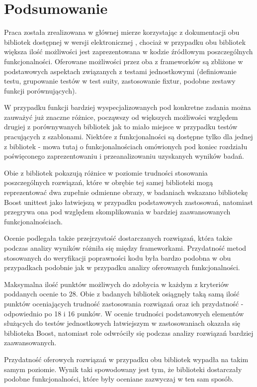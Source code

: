 \documentclass[12pt,a4paper,notitlepage]{report}
\begin{document}
\chapter{Podsumowanie}
	Praca została zrealizowana w głównej mierze korzystając z dokumentacji obu bibliotek dostępnej w wersji elektronicznej \cite{Primer}\cite{Advanced}\cite{Boost}, chociaż w przypadku obu bibliotek większa ilość możliwości jest zaprezentowana w kodzie źródłowym poszczególnych funkcjonalności. Oferowane możliwości przez oba z frameworków są zbliżone w podstawowych aspektach związanych z testami jednostkowymi (definiowanie testu, grupowanie testów w test suity, zastosowanie fixtur, podobne zestawy funkcji porównujących).

	W przypadku funkcji bardziej wyspecjalizowanych pod konkretne zadania można zauważyć już znaczne różnice, począwszy od większych możliwości względem drugiej z porównywanych bibliotek jak to miało miejsce w przypadku testów pracujących z szablonami. Niektóre z funkcjonalności są dostępne tylko dla jednej z bibliotek - mowa tutaj o funkcjonalnościach omówionych pod koniec rozdziału poświęconego zaprezentowaniu i przeanalizowaniu uzyskanych wyników badań.

	Obie z bibliotek pokazują różnice w poziomie trudności stosowania poszczególnych rozwiązań, które w obrębie tej samej biblioteki mogą reprezentować dwa zupełnie odmienne obrazy, w badaniach wskazano bibliotekę Boost unittest jako łatwiejszą w przypadku podstawowych zastosowań, natomiast przegrywa ona pod względem skomplikowania w bardziej zaawansowanych funkcjonalnościach.

	Ocenie podlegała także przejrzystość dostarczanych rozwiązań, która także podczas analizy wyników różniła się między frameworkami. Przydatność metod stosowanych do weryfikacji poprawności kodu była bardzo podobna w obu przypadkach podobnie jak w przypadku analizy oferowanych funkcjonalności.

	Maksymalna ilość punktów możliwych do zdobycia w każdym z kryteriów poddanych ocenie to 28. Obie z badanych bibliotek osiągnęły taką samą ilość punktów oceniających trudność zastosowania rozwiązań oraz ich przydatność - odpowiednio po 18 i 16 punków. W ocenie trudności podstawowych elementów służących do testów jednostkowych łatwiejszym w zastosowaniach okazała się biblioteka Boost, natomiast role odwróciły się podczas analizy rozwiązań bardziej zaawansowanych.

	Przydatność oferowych rozwiązań w przypadku obu bibliotek wypadła na takim samym poziomie. Wynik taki spowodowany jest tym, że biblioteki dostarczały podobne funkcjonalności, które były oceniane zazwyczaj w ten sam sposób.
\end{document}
